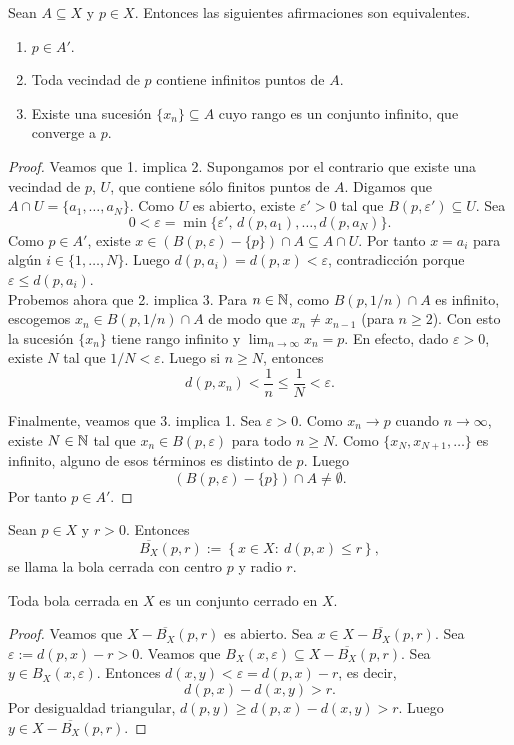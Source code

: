 \begin{teorema}\label{teo-acum1}
Sean $A\subseteq X$ y $p\in X$. Entonces las siguientes afirmaciones son equivalentes.
\begin{enumerate}
    \item $p\in A'$.
    \item Toda vecindad de $p$ contiene infinitos puntos de $A$.
    \item Existe una sucesión $\{x_n\}\subseteq A$ cuyo rango es un conjunto infinito, que converge a $p$.
\end{enumerate}
\end{teorema}
\begin{proof}
Veamos que 1. implica 2. Supongamos por el contrario que existe una vecindad de $p$, $U$, que contiene sólo finitos puntos de $A$. Digamos que $A\cap U=\{a_1,\dots,a_N\}$. Como $U$ es abierto, existe $\varepsilon'>0$ tal que $B(p,\varepsilon')\subseteq U$. Sea
\[
0<\varepsilon=\min\{\varepsilon',\, d(p,a_1),\dots,d(p,a_N)\}.
\]
Como $p\in A'$, existe $x\in (B(p,\varepsilon)-\{p\})\cap A\subseteq A\cap U$. Por tanto $x=a_i$ para algún $i\in\{1,\dots,N\}$. Luego $d(p,a_i)=d(p,x)<\varepsilon$, contradicción porque $\varepsilon\le d(p,a_i)$.\\

Probemos ahora que 2. implica 3. Para $n\in\mathbb{N}$, como $B(p,1/n)\cap A$ es infinito, escogemos $x_n\in B(p,1/n)\cap A$ de modo que $x_n\neq x_{n-1}$ (para $n\ge2$). Con esto la sucesión $\{x_n\}$ tiene rango infinito y $\lim_{n\to\infty}x_n=p$. En efecto, dado $\varepsilon>0$, existe $N$ tal que $1/N<\varepsilon$. Luego si $n\ge N$, entonces
\[
d(p,x_n)<\frac{1}{n}\le\frac{1}{N}<\varepsilon.
\]

Finalmente, veamos que 3. implica 1. Sea $\varepsilon>0$. Como $x_n\to p$ cuando $n\to\infty$, existe $N\in\mathbb{N}$ tal que $x_n\in B(p,\varepsilon)$ para todo $n\ge N$. Como $\{x_N,x_{N+1},\dots\}$ es infinito, alguno de esos términos es distinto de $p$. Luego
\[
\left(B(p,\varepsilon)-\{p\}\right)\cap A\neq\emptyset.
\]
Por tanto $p\in A'$.
\end{proof}

\begin{definicion}
Sean $p\in X$ y $r>0$. Entonces
\[
\overline{B_X}(p,r):=\left\{x\in X:\ d(p,x)\le r\right\},
\]
se llama la bola cerrada con centro $p$ y radio $r$.
\end{definicion}

\begin{teorema}
Toda bola cerrada en $X$ es un conjunto cerrado en $X$.
\end{teorema}
\begin{proof}
Veamos que $X-\overline{B_X}(p,r)$ es abierto. Sea $x\in X-\overline{B_X}(p,r)$. Sea $\varepsilon:=d(p,x)-r>0$. Veamos que $B_X(x,\varepsilon)\subseteq X-\overline{B_X}(p,r)$. Sea $y\in B_X(x,\varepsilon)$. Entonces $d(x,y)<\varepsilon=d(p,x)-r$, es decir,
\[
d(p,x)-d(x,y)>r.
\]
Por desigualdad triangular, $d(p,y)\ge d(p,x)-d(x,y)>r$. Luego $y\in X-\overline{B_X}(p,r)$.
\end{proof}

